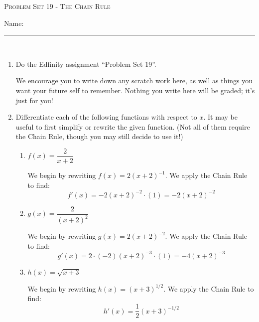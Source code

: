 \documentclass{article}
\newcommand{\doedfinity}[2][\newpage]{
  \begin{problem}[#1]
    Do the Edfinity assignment ``Problem Set #2''.

    We encourage you to write down any scratch work here, as well as
    things you want your future self to remember. Nothing you write
    here will be graded; it's just for you!
  \end{problem}
}
\begin{document}
\begin{center}
  \large\textsc{Problem Set 19 - The Chain Rule}\vspace{.5in}\\
  \begin{problemonly}
   \large Name: \rule{5cm}{0.15mm}\\
   \end{problemonly}
\end{center}

\begin{enumerate}
\item 

  \doedfinity{19} 

\item 

  

  Differentiate each of the following functions with respect to $x$. It may be useful to
    first simplify or rewrite the given function.  (Not all of them require the Chain Rule, though you may still decide to use it!)

      \begin{enumerate}
      \item
        \begin{problem}[\vfill]
          $f(x)=\dfrac{2}{x+2}$
        \end{problem}

      \begin{solution}
        We begin by rewriting $f(x) = 2 (x+2)^{-1}$. We apply the Chain Rule to find:
        $$f'(x) = -2(x+2)^{-2}\cdot(1) = -2(x+2)^{-2}$$
      \end{solution}

    \item
      \begin{problem}[\vfill]
        $g(x)=\dfrac{2}{(x+2)^2}$
      \end{problem}

      \begin{solution}
        We begin by rewriting $g(x) = 2(x+2)^{-2}$. We apply the Chain Rule to find:
        $$g'(x) = 2\cdot (-2)(x+2)^{-3}\cdot (1) = -4(x+2)^{-3}$$
      \end{solution}

    \item
      \begin{problem}[\vfill]
        $h(x)=\sqrt{x+3}$
      \end{problem}

      \begin{solution}
        We begin by rewriting $h(x) = (x+3)^{1/2}$. We apply the Chain Rule to find:
        $$h'(x) = \frac{1}{2}(x+3)^{-1/2}$$
      \end{solution}


\end{enumerate}
\end{enumerate}
\end{document}

